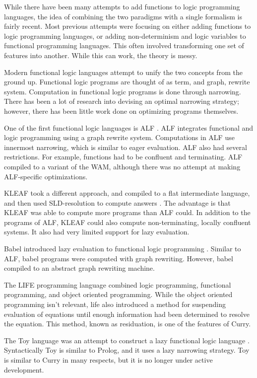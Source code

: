 
While there have been many attempts to add functions to logic programming languages,
the idea of combining the two paradigms with a single formalism is fairly recent.
Most previous attempts were focusing on either adding functions to logic programming languages,
or adding non-determinism and logic variables to functional programming languages.
This often involved transforming one set of features into another.
While this can work, the theory is messy.

Modern functional logic languages attempt to unify the two concepts from the ground up.
Functional logic programs are thought of as term, and graph, rewrite system.
Computation in functional logic programs is done through narrowing.
There has been a lot of research into devising an optimal narrowing strategy;
however, there has been little work done on optimizing programs themselves.

One of the first functional logic languages is ALF \cite{alf}.
ALF integrates functional and logic programming using a graph rewrite system.
Computations in ALF use innermost narrowing, which is similar to eager evaluation.
ALF also had several restrictions. 
For example, functions had to be confluent and terminating.
ALF compiled to a variant of the WAM, 
although there was no attempt at making ALF-specific optimizations.

KLEAF took a different approach, and compiled to a flat intermediate language, 
and then used SLD-resolution to compute answers \cite{kleaf}.
The advantage is that KLEAF was able to compute more programs than ALF could.
In addition to the programs of ALF,
KLEAF could also compute non-terminating, locally confluent systems.
It also had very limited support for lazy evaluation.

Babel introduced lazy evaluation to functional logic programming \cite{babel}.
Similar to ALF, babel programs were computed with graph rewriting. 
However, babel compiled to an abstract graph rewriting machine.

The LIFE programming language combined logic programming, functional programming,
and object oriented programming. \cite{life}
While the object oriented programming isn't relevant, life also introduced a method
for suspending evaluation of equations until enough information had been determined
to resolve the equation.  This method, known as residuation, is one of the features of Curry.

The Toy language was an attempt to construct a lazy functional logic language \cite{toy}.
Syntactically Toy is similar to Prolog, and it uses a lazy narrowing strategy.
Toy is similar to Curry in many respects, but it is no longer under active development.

